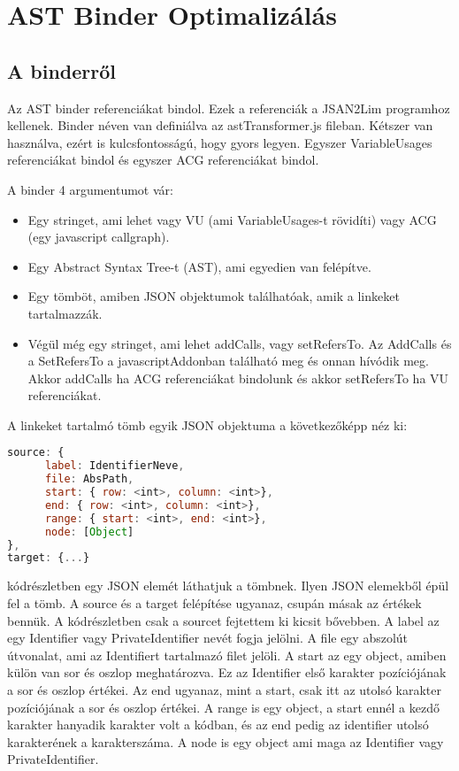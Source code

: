 \chapter{AST Binder Optimalizálás}\label{chap:AST Binder Optimalizálás}

\section{A binderről}

\noindent

Az AST binder referenciákat bindol. Ezek a referenciák a JSAN2Lim programhoz kellenek.
Binder néven van definiálva az astTransformer.js fileban.
Kétszer van használva, ezért is kulcsfontosságú, hogy gyors legyen.
Egyszer VariableUsages referenciákat bindol és egyszer ACG referenciákat bindol.

\noindent

A binder 4 argumentumot vár:

\begin{itemize}
      \item Egy stringet, ami lehet vagy VU (ami VariableUsages-t rövidíti) vagy ACG (egy javascript callgraph).
      \item Egy Abstract Syntax Tree-t (AST), ami egyedien van felépítve.
      \item Egy tömböt, amiben JSON objektumok találhatóak, amik a linkeket tartalmazzák.
      \item Végül még egy stringet, ami lehet addCalls, vagy setRefersTo. Az AddCalls és a SetRefersTo a javascriptAddonban található meg és onnan hívódik meg.
      Akkor addCalls ha ACG referenciákat bindolunk és akkor setRefersTo ha VU referenciákat.
\end{itemize}

A linkeket tartalmó tömb egyik JSON objektuma a következőképp néz ki:

\begin{lstlisting}[caption={Binder JSON argumentuma}, label={lst:binder_json_arg}, language={JavaScript}]
source: {
      label: IdentifierNeve,
      file: AbsPath,
      start: { row: <int>, column: <int>},
      end: { row: <int>, column: <int>},
      range: { start: <int>, end: <int>},
      node: [Object]
},
target: {...}
\end{lstlisting}

 kódrészletben egy JSON elemét láthatjuk a tömbnek. Ilyen JSON elemekből épül fel a tömb.
A source és a target felépítése ugyanaz, csupán másak az értékek bennük.
A kódrészletben csak a sourcet fejtettem ki kicsit bővebben. A label az egy Identifier vagy PrivateIdentifier nevét fogja jelölni.
A file egy abszolút útvonalat, ami az Identifiert tartalmazó filet jelöli.
A start az egy object, amiben külön van sor és oszlop meghatározva. Ez az Identifier első karakter pozíciójának a sor és oszlop értékei.
Az end ugyanaz, mint a start, csak itt az utolsó karakter pozíciójának a sor és oszlop értékei.
A range is egy object, a start ennél a kezdő karakter hanyadik karakter volt a kódban, és az end pedig az identifier utolsó karakterének a karakterszáma.
A node is egy object ami maga az Identifier vagy PrivateIdentifier.

